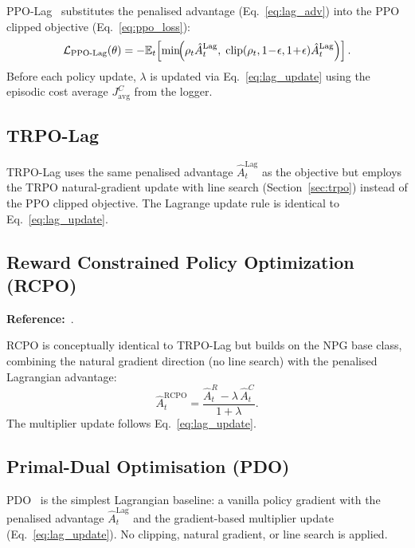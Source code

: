 \documentclass[12pt,a4paper]{article}
\theoremstyle{definition}
\newcommand{\E}{\mathbb{E}}
\newcommand{\lagm}{\lambda}
\begin{document}
PPO-Lag~\citep{ray2019benchmarking} substitutes the penalised advantage (Eq.~\ref{eq:lag_adv})
into the PPO clipped objective (Eq.~\ref{eq:ppo_loss}):
\begin{equation}
  \mathcal{L}_{\mathrm{PPO\text{-}Lag}}(\theta) = -\E_t\!\left[
    \min\!\Bigl(\rho_t\hat{A}_t^{\mathrm{Lag}},\;\mathrm{clip}(\rho_t,1\!-\!\epsilon,1\!+\!\epsilon)\hat{A}_t^{\mathrm{Lag}}\Bigr)
  \right].
\end{equation}
Before each policy update, $\lagm$ is updated via Eq.~\ref{eq:lag_update} using the
episodic cost average $J^C_{\mathrm{avg}}$ from the logger.

\subsection{TRPO-Lag}
\label{sec:trpolag}

TRPO-Lag uses the same penalised advantage $\hat{A}_t^{\mathrm{Lag}}$ as the objective but
employs the TRPO natural-gradient update with line search (Section~\ref{sec:trpo}) instead
of the PPO clipped objective. The Lagrange update rule is identical to Eq.~\ref{eq:lag_update}.

\subsection{Reward Constrained Policy Optimization (RCPO)}
\label{sec:rcpo}

\textbf{Reference:}~\citet{tessler2018reward}.

RCPO is conceptually identical to TRPO-Lag but builds on the NPG base class, combining
the natural gradient direction (no line search) with the penalised Lagrangian advantage:
\begin{equation}
  \hat{A}_t^{\mathrm{RCPO}} = \frac{\hat{A}_t^R - \lagm\,\hat{A}_t^C}{1+\lagm}.
\end{equation}
The multiplier update follows Eq.~\ref{eq:lag_update}.

\subsection{Primal-Dual Optimisation (PDO)}
\label{sec:pdo}

PDO~\citep{chow2017risk} is the simplest Lagrangian baseline: a vanilla policy gradient
with the penalised advantage $\hat{A}_t^{\mathrm{Lag}}$ and the gradient-based multiplier
update (Eq.~\ref{eq:lag_update}). No clipping, natural gradient, or line search is applied.
\end{document}
